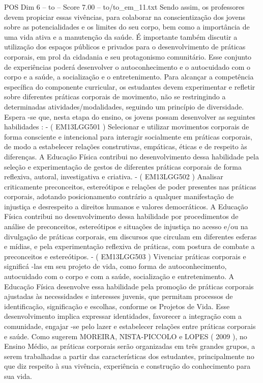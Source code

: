 \begin{textsample}{POS Dim 6 – to – Score 7.00 – to/to\_em\_11.txt}
Sendo assim, os professores devem propiciar essas vivências, para colaborar na conscientização dos jovens sobre as potencialidades e os limites do seu corpo, bem como a importância de uma vida ativa e a manutenção da saúde.
É importante também discutir a utilização dos espaços públicos e privados para o desenvolvimento de práticas corporais, em prol da cidadania e seu protagonismo comunitário.
Esse conjunto de experiências poderá desenvolver o autoconhecimento e o autocuidado com o corpo e a saúde, a socialização e o entretenimento.
Para alcançar a competência específica do componente curricular, os estudantes devem experimentar e refletir sobre diferentes práticas corporais de movimento, não se restringindo a determinadas atividades/modalidades, seguindo um princípio de diversidade.
Espera -se que, nesta etapa do ensino, os jovens possam desenvolver as seguintes habilidades : - ( EM13LGG501 ) Selecionar e utilizar movimentos corporais de forma consciente e intencional para interagir socialmente em práticas corporais, de modo a estabelecer relações construtivas, empáticas, éticas e de respeito às diferenças.
A Educação Física contribui no desenvolvimento dessa habilidade pela seleção e experimentação de gestos de diferentes práticas corporais de forma reflexiva, autoral, investigativa e criativa. - ( EM13LGG502 ) Analisar criticamente preconceitos, estereótipos e relações de poder presentes nas práticas corporais, adotando posicionamento contrário a qualquer manifestação de injustiça e desrespeito a direitos humanos e valores democráticos.
A Educação Física contribui no desenvolvimento dessa habilidade por procedimentos de análise de preconceitos, estereótipos e situações de injustiça no acesso e/ou na divulgação de práticas corporais, em discursos que circulam em diferentes esferas e mídias, e pela experimentação reflexiva de práticas, com postura de combate a preconceitos e estereótipos. - ( EM13LGG503 ) Vivenciar práticas corporais e significá -las em seu projeto de vida, como forma de autoconhecimento, autocuidado com o corpo e com a saúde, socialização e entretenimento.
A Educação Física desenvolve essa habilidade pela promoção de práticas corporais ajustadas às necessidades e interesses juvenis, que permitam processos de identificação, significação e escolhas, conforme os Projetos de Vida.
Esse desenvolvimento implica expressar identidades, favorecer a integração com a comunidade, engajar -se pelo lazer e estabelecer relações entre práticas corporais e saúde.
Como sugerem MOREIRA, NISTA-PICCOLO e LOPES ( 2009 ), no Ensino Médio, as práticas corporais serão organizadas em três grandes grupos, a serem trabalhadas a partir das características dos estudantes, principalmente no que diz respeito à sua vivência, experiência e construção do conhecimento para sua vida.

\end{textsample}
